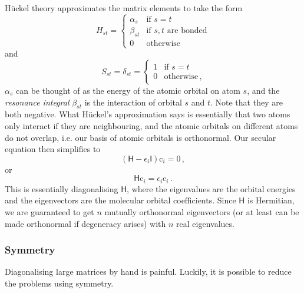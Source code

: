 \documentclass{article}
\theoremstyle{plain}\theoremheaderfont{\normalfont\itshape}\theorembodyfont{\rmfamily}\theoremseparator{.}\newtheorem*{rem}{Remark}\newtheorem*{ex}{Example}\newtheorem*{proof}{Proof}\newtheorem*{altp}{Alternative proof}
\theoremstyle{plain}\theoremheaderfont{\normalfont\bfseries}\theorembodyfont{\rmfamily}\theoremseparator{.}\newtheorem{thm}{Theorem}[section]\newtheorem{lem}[thm]{Lemma}\newtheorem{prop}[thm]{Proposition}\newtheorem*{cor}{Corollary}\newtheorem{defn}[thm]{Definition}\newtheorem{clm}[thm]{Claim}\newtheorem{clminproof}{Claim}\newtheorem{pos}{Postulate}[section]
\theoremstyle{break}\theoremheaderfont{\normalfont\itshape}\theorembodyfont{\rmfamily}\theoremseparator{.\medskip}\newtheorem*{proofskip}{Proof}\newtheorem*{exs}{Examples}\newtheorem*{rems}{Remarks}
\theoremstyle{break}\theoremheaderfont{\normalfont\bfseries}\theorembodyfont{\rmfamily}\theoremseparator{.\medskip}\newtheorem{lemskip}[thm]{Lemma}\newtheorem{defnskip}[thm]{Definition}\newtheorem{propskip}[thm]{Proposition}\newtheorem{thmskip}[thm]{Theorem}
\numberwithin{equation}{section}
\newcommand{\vb}[1]{\bm{\mathrm{#1}}}
\begin{document}
    H\"{u}ckel theory approximates the matrix elements to take the form
    \begin{equation}
        H_{st}=\begin{cases}
            \alpha_{s} & \text{if }s=t\\
            \beta_{st} & \text{if }s,t\text{ are bonded}\\
            0 & \text{otherwise}
        \end{cases}
    \end{equation}
    and
    \begin{equation}
        S_{st}=\delta_{st}=\begin{cases}
            1 & \text{if }s=t\\
            0 & \text{otherwise}\,,
        \end{cases}
    \end{equation}
    \(\alpha_s\) can be thought of as the energy of the atomic orbital on atom \(s\), and the \textit{resonance integral} \(\beta_{st}\) is the interaction of orbital \(s\) and \(t\). Note that they are both negative. What H\"{u}ckel's approximation says is essentially that two atoms only interact if they are neighbouring, and the atomic orbitals on different atoms do not overlap, i.e. our basis of atomic orbitals is orthonormal. Our secular equation then simplifies to
    \begin{equation}
        (\mathsf{H}-\epsilon_i\mathsf{I})\vb{c}_i=\vb{0}\,,
    \end{equation}
    or
    \begin{equation}
        \mathsf{H}\vb{c}_i=\epsilon_i\vb{c}_i\,.
    \end{equation}
    This is essentially diagonalising \(\mathsf{H}\), where the eigenvalues are the orbital energies and the eigenvectors are the molecular orbital coefficients. Since \(\mathsf{H}\) is Hermitian, we are guaranteed to get \(n\) mutually orthonormal eigenvectors (or at least can be made orthonormal if degeneracy arises) with \(n\) real eigenvalues.

    \subsubsection{Symmetry}
    Diagonalising large matrices by hand is painful. Luckily, it is possible to reduce the problems using symmetry.
\end{document}
